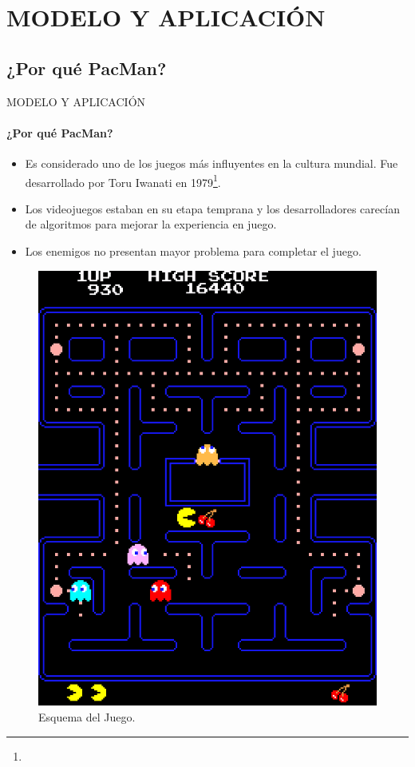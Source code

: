 \section{MODELO Y APLICACIÓN}
\subsection{¿Por qué PacMan?}
\begin{frame}{MODELO Y APLICACIÓN}
    \framesubtitle{¿Por qué PacMan?}
    \begin{itemize}
      \item Es considerado uno de los juegos más influyentes en la cultura mundial. Fue desarrollado por Toru Iwanati en 1979\footnote{}.
      \item Los videojuegos estaban en su etapa temprana y los desarrolladores carecían de algoritmos para mejorar la experiencia en juego.
      \item Los enemigos no presentan mayor problema para completar el juego.
    \end{itemize}
    \begin{figure}[H]
      \includegraphics[scale=0.5]{files/pacman.jpg}
      \caption{Esquema del Juego\footnotemark{}.}
    \end{figure}
    \vspace{-1cm}
\end{frame}

